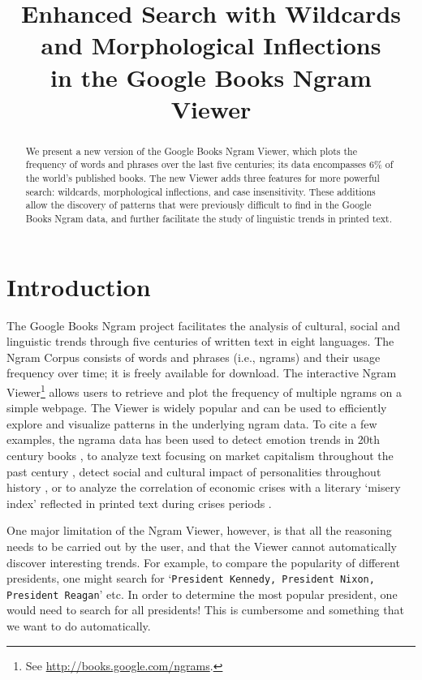 \documentclass[11pt]{article}
\title{Enhanced Search with Wildcards and Morphological Inflections\\in the Google Books Ngram Viewer}
\date{}
\begin{document}
\maketitle

\begin{abstract}

We present a new version of the Google Books Ngram Viewer, which plots
the frequency of words and phrases over the last five
centuries; its data encompasses 6\% of the world's published books.
The new Viewer adds three features for more powerful search: wildcards,
morphological inflections, and case insensitivity. These additions allow
the discovery of patterns that were previously difficult to find in the Google Books Ngram data,
and further facilitate the study of linguistic trends in printed text.

\end{abstract}

\section{Introduction}

The Google Books Ngram project facilitates the analysis of cultural, social and linguistic trends through five centuries of written text in eight languages. The Ngram Corpus \cite{culturomics,lin2012syntactic} consists of words and phrases (i.e., ngrams) and their usage frequency over time; it is freely available for download. The interactive Ngram Viewer\footnote{See \url{http://books.google.com/ngrams}.} allows users to retrieve and plot the frequency of multiple ngrams on a simple webpage. The Viewer is widely popular and can be used to efficiently explore and visualize patterns in the underlying ngram data. To cite a few examples, the ngrama data has been used to detect emotion trends in 20th century books \cite{acerbi.etal.2013}, to analyze text focusing on market capitalism throughout the past century \cite{Schulz2013}, detect social and cultural impact of personalities throughout history \cite{skiena.ward.2013}, or to analyze the correlation of economic crises with a literary `misery index' reflected in printed text during crises periods \cite{bentley.et.al.2014}.

One major limitation of the Ngram Viewer, however, is that all the reasoning needs to be carried out by the user, and that the Viewer cannot automatically discover interesting trends. For example, to compare the popularity of different presidents, one might search for `\texttt{President Kennedy, President Nixon, President Reagan}' etc. In order to determine the most popular president, one would need to search for all presidents! This is cumbersome and something that we want to do automatically.
\end{document}
